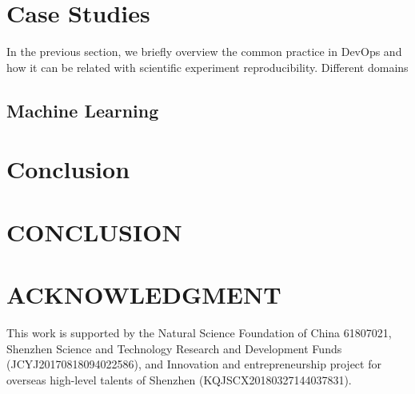 \documentclass{IEEEcsmag}
\begin{document}
\section{Case Studies}
In the previous section, we briefly overview the common practice in DevOps and how it can be related with scientific experiment reproducibility. Different domains 

\subsection{Machine Learning}






\section{Conclusion}


\section{CONCLUSION}


\section{ACKNOWLEDGMENT}

This work is supported by the Natural Science Foundation of China 61807021, Shenzhen Science and Technology Research and Development Funds (JCYJ20170818094022586), and Innovation and entrepreneurship project for overseas high-level talents of Shenzhen (KQJSCX20180327144037831).




\end{document}
